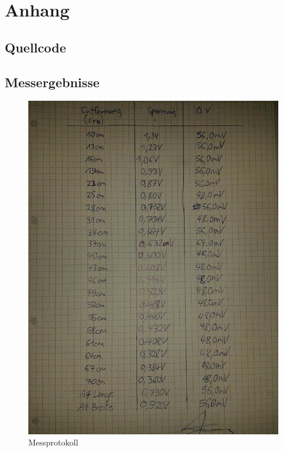 \documentclass[TGAI_Laborbericht.tex]{subfiles}
\begin{document}
\chapter*{Anhang}
\label{chap:APPENDIX}
\addtocounter{chapter}{1}
\setcounter{section}{0}

\section{Quellcode}
\label{chap:APPENDIX_SOURCECODE}




\section{Messergebnisse}
\label{chap:APPENDIX_MEASUREMENT_SOURCE}

\begin{figure}[H]
\includegraphics[scale=0.6]{media/Messprotokoll.jpg}
\caption{Messprotokoll}
\end{figure}
%
%

\clearpage
\end{document}
